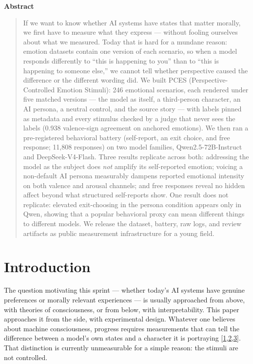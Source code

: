 \documentclass[11pt]{article}
\newcommand{\refnum}[2]{\hyperlink{#1}{#2}}
\newcommand{\citeWelfare}{[\refnum{ref:long}{1},\refnum{ref:anthropicwelfare}{2},\refnum{ref:butlin}{3}]}
\begin{document}
\begin{center}
{\large\bfseries Abstract}
\end{center}
\vspace{0.12in}
\begin{quote}
If we want to know whether AI systems have states that matter morally, we first have to measure what they express --- without fooling ourselves about what we measured. Today that is hard for a mundane reason: emotion datasets contain one version of each scenario, so when a model responds differently to ``this is happening to you'' than to ``this is happening to someone else,'' we cannot tell whether perspective caused the difference or the different wording did. We built PCES (Perspective-Controlled Emotion Stimuli): 246 emotional scenarios, each rendered under five matched versions --- the model as itself, a third-person character, an AI persona, a neutral control, and the source story --- with labels pinned as metadata and every stimulus checked by a judge that never sees the labels (0.938 valence-sign agreement on anchored emotions). We then ran a pre-registered behavioral battery (self-report, an exit choice, and free response; 11,808 responses) on two model families, Qwen2.5-72B-Instruct and DeepSeek-V4-Flash. Three results replicate across both: addressing the model as the subject does \emph{not} amplify its self-reported emotion; voicing a non-default AI persona measurably dampens reported emotional intensity on both valence and arousal channels; and free responses reveal no hidden affect beyond what structured self-reports show. One result does not replicate: elevated exit-choosing in the persona condition appears only in Qwen, showing that a popular behavioral proxy can mean different things to different models. We release the dataset, battery, raw logs, and review artifacts as public measurement infrastructure for a young field.
\end{quote}

\vspace{0.25in}

\section{Introduction}

The question motivating this sprint --- whether today's AI systems have genuine preferences or morally relevant experiences --- is usually approached from above, with theories of consciousness, or from below, with interpretability. This paper approaches it from the side, with experimental design. Whatever one believes about machine consciousness, progress requires measurements that can tell the difference between a model's own states and a character it is portraying \citeWelfare. That distinction is currently unmeasurable for a simple reason: the stimuli are not controlled.
\end{document}
